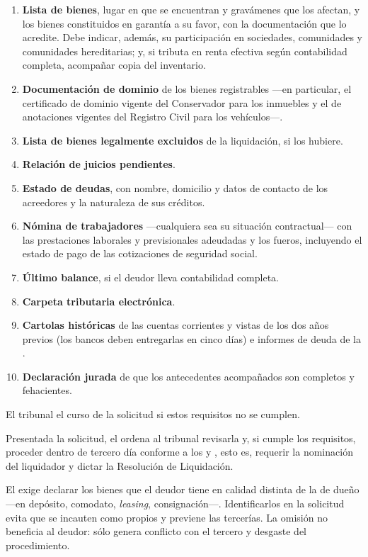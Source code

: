 \begin{enumerate}
  \item \textbf{Lista de bienes}, lugar en que se encuentran y gravámenes que los afectan,
   y los
  bienes constituidos en garantía a su favor, con la documentación que lo acredite. Debe
  indicar, además, su participación en sociedades, comunidades y comunidades hereditarias; y,
  si tributa en renta efectiva según contabilidad completa, acompañar copia del inventario.
  \item \textbf{Documentación de dominio} de los bienes registrables ---en particular, el
  certificado de dominio vigente del Conservador para los inmuebles y el de anotaciones vigentes
  del Registro Civil para los vehículos---.
  \item \textbf{Lista de bienes legalmente excluidos} de la liquidación, si los hubiere.
  \item \textbf{Relación de juicios pendientes}.
  \item \textbf{Estado de deudas}, con nombre, domicilio y datos de contacto de los acreedores y
  la naturaleza de sus créditos.
  \item \textbf{Nómina de trabajadores} ---cualquiera sea su situación contractual--- con las
  prestaciones laborales y previsionales adeudadas y los fueros, incluyendo el estado de pago de
  las cotizaciones de seguridad social.
  \item \textbf{Último balance}, si el deudor lleva contabilidad completa.
  \item \textbf{Carpeta tributaria electrónica}.
  \item \textbf{Cartolas históricas} de las cuentas corrientes y vistas de los dos años previos
  (los bancos deben entregarlas en cinco días) e informes de deuda de la \cmf{}.
  \item \textbf{Declaración jurada} de que los antecedentes acompañados son completos y
  fehacientes.
\end{enumerate}

El tribunal  el curso de la solicitud si estos requisitos no se cumplen.

Presentada la solicitud, el  ordena al tribunal revisarla y, si cumple los
requisitos, proceder dentro de tercero día conforme a los  y , esto es,
requerir la nominación del liquidador y dictar la Resolución de Liquidación.

\begin{practica}
El  exige declarar los bienes que el deudor tiene en calidad distinta de la de
dueño ---en depósito, comodato, \emph{leasing}, consignación---. Identificarlos en la
solicitud evita que se incauten como propios y previene las tercerías. La omisión no
beneficia al deudor: sólo genera conflicto con el tercero y desgaste del procedimiento.
\end{practica}

